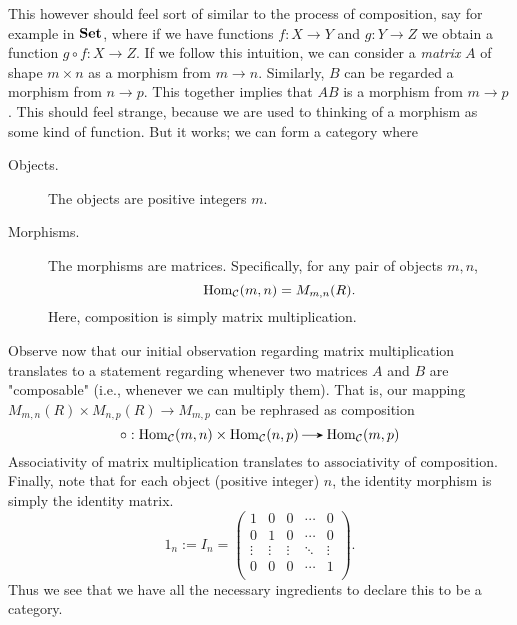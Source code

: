 \begin{example}
        This however should feel sort of similar to the process of composition, say for example in $\operatorname{\mathbf{Set}}$, 
        where if we  have functions $f: X \to Y$  and $g: Y \to Z$ we obtain a function $g \circ f:
        X \to Z$. If we follow this intuition, we can consider a \emph{matrix} $A$ 
        of shape $m \times n$ as a morphism from $m \to n$. Similarly,
        $B$ can be regarded a morphism from $n \to p$. This together implies that 
        $AB$ is a morphism from $m \to p$. 
        This should feel strange, because we are used to thinking of a morphism as some kind 
        of function. But it works; we can form a category where  
        \begin{description}
            \item[Objects.] The objects are positive integers $m$.
            \item[Morphisms.] The morphisms are matrices. Specifically, for any pair of 
            objects $m,n$, 
            \[
                \operatorname{\mathrm{Hom}}_{\mathcal{C}}(m, n) = M_{m, n}(R).
            \]
            Here, composition is simply matrix multiplication.
        \end{description}
        Observe now that our initial observation regarding matrix multiplication
        translates to a statement regarding whenever two matrices $A$ and $B$ are 
        "composable" (i.e., whenever we can multiply them). That is, 
        our mapping $M_{m,n}(R)\times M_{n,p}(R) \to M_{m, p}$ can be rephrased as composition
        \[
            \circ: \hom_{\cc}(m, n) \times \hom_{\cc}(n, p) \to \hom_{\cc}(m, p)
        \] 
        Associativity of matrix multiplication translates to associativity of composition. 
        Finally, note that for each object (positive integer) $n$, the identity morphism is 
        simply the identity matrix. 
        \[
            1_n  := I_n = 
            \begin{pmatrix}
                1 & 0 & 0  & \cdots & 0\\
                0 & 1 & 0  & \cdots & 0\\
                \vdots & \vdots & \vdots & \ddots & \vdots\\
                0 & 0 & 0 & \cdots & 1\\
            \end{pmatrix}.
        \]
        Thus we see that we have all the necessary ingredients to declare this to be a category. 
    \end{example}


